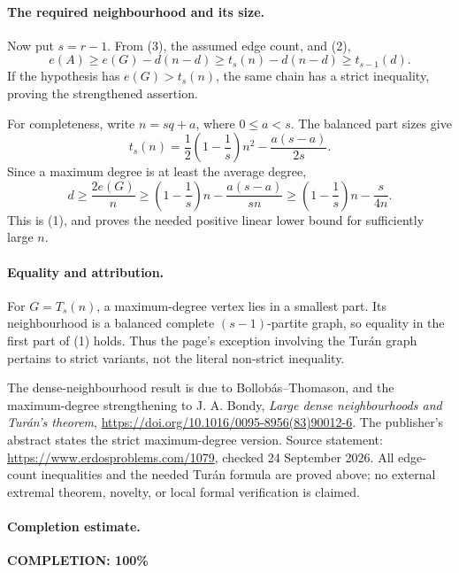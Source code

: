 \paragraph{The required neighbourhood and its size.}
Now put \(s=r-1\). From (3), the assumed edge count, and (2),
\[
 e(A)\geq e(G)-d(n-d)
 \geq t_s(n)-d(n-d)
 \geq t_{s-1}(d).
\]
If the hypothesis has \(e(G)>t_s(n)\), the same chain has a strict inequality, proving the strengthened assertion.

For completeness, write \(n=sq+a\), where \(0\leq a<s\). The balanced part sizes give
\[
 t_s(n)=\frac12\left(1-\frac1s\right)n^2
             -\frac{a(s-a)}{2s}.
\]
Since a maximum degree is at least the average degree,
\[
 d\geq\frac{2e(G)}n\geq
 \left(1-\frac1s\right)n-\frac{a(s-a)}{sn}
 \geq\left(1-\frac1s\right)n-\frac{s}{4n}.
\]
This is (1), and proves the needed positive linear lower bound for sufficiently large \(n\).

\paragraph{Equality and attribution.}
For \(G=T_s(n)\), a maximum-degree vertex lies in a smallest part. Its neighbourhood is a balanced complete \((s-1)\)-partite graph, so equality in the first part of (1) holds. Thus the page's exception involving the Tur\'an graph pertains to strict variants, not the literal non-strict inequality.

The dense-neighbourhood result is due to Bollob\'as--Thomason, and the maximum-degree strengthening to J. A. Bondy, \emph{Large dense neighbourhoods and Tur\'an's theorem}, \url{https://doi.org/10.1016/0095-8956(83)90012-6}. The publisher's abstract states the strict maximum-degree version. Source statement: \url{https://www.erdosproblems.com/1079}, checked 24 September 2026. All edge-count inequalities and the needed Tur\'an formula are proved above; no external extremal theorem, novelty, or local formal verification is claimed.

\paragraph{Completion estimate.}
\textbf{COMPLETION: 100\%}
